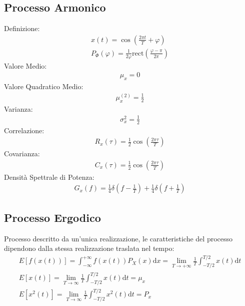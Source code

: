 \documentclass{article}
\newcommand{\rect}{\mathrm{rect}}
\newcommand{\df}{\mathrm{d}}
\newcommand{\intinf}{\displaystyle\int_{-\infty}^{+\infty}}
\newcommand{\intp}{\displaystyle\frac{1}{T}\int_{-T/2}^{T/2}}
\begin{document}
\subsection*{Processo Armonico}
Definizione:
\begin{gather*}
    x(t)=\cos\left(\displaystyle\frac{2\pi t}{T}+\varphi\right)\\
    P_{\Phi}(\varphi)=\displaystyle\frac{1}{2\varphi}\rect\left(\frac{\varphi-\pi}{2\pi}\right)
\end{gather*}
Valore Medio:
\begin{gather*}
    \mu_x=0
\end{gather*}
Valore Quadratico Medio:
\begin{gather*}
    \mu_x^{(2)}=\displaystyle\frac{1}{2}
\end{gather*}
Varianza:
\begin{gather*}
    \sigma_x^2=\displaystyle\frac{1}{2}
\end{gather*}
Correlazione:
\begin{gather*}
    R_x(\tau)=\displaystyle\frac{1}{2}\cos\left(\frac{2\pi\tau}{T}\right)
\end{gather*}
Covarianza:
\begin{gather*}
    C_x(\tau)=\displaystyle\frac{1}{2}\cos\left(\frac{2\pi\tau}{T}\right)
\end{gather*}
Densità Spettrale di Potenza:
\begin{gather*}
    G_x(f)=\displaystyle\frac{1}{4}\delta\left(f-\frac{1}{T}\right)+\frac{1}{4}\delta\left(f+\frac{1}{T}\right)
\end{gather*}
\subsection*{Processo Ergodico}
Processo descritto da un'unica realizzazione, le caratteristiche del processo dipendono dalla stessa realizzazione traslata nel tempo:
\begin{gather*}
    E[f(x(t))]=\intinf f(x(t))P_X(x)\df x=\lim_{T\to+\infty}\intp x(t)\df t\\
    E[x(t)]=\displaystyle\lim_{T\to\infty}\frac{1}{T}\int_{-T/2}^{T/2}x(t)\df t=\mu_x\\
    E[x^2(t)]=\displaystyle\lim_{T\to\infty}\frac{1}{T}\int_{-T/2}^{T/2}x^2(t)\df t=P_x
\end{gather*}
\end{document}
